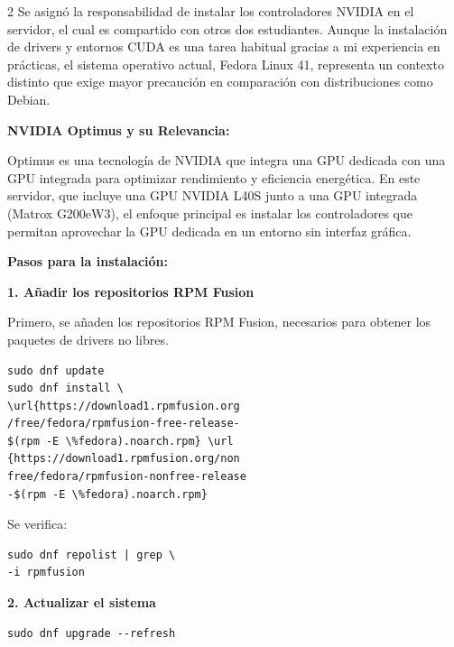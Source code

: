 \begin{multicols*}{2}
Se asignó la responsabilidad de instalar los controladores NVIDIA en el servidor, el cual es compartido con otros dos estudiantes. Aunque la instalación de drivers y entornos CUDA es una tarea habitual gracias a mi experiencia en prácticas, el sistema operativo actual, Fedora Linux 41, representa un contexto distinto que exige mayor precaución en comparación con distribuciones como Debian.

\vspace{\baselineskip}


\noindent\textbf{NVIDIA Optimus y su Relevancia:} 

Optimus es una tecnología de NVIDIA que integra una GPU dedicada con una GPU integrada para optimizar rendimiento y eficiencia energética. En este servidor, que incluye una GPU NVIDIA L40S junto a una GPU integrada (Matrox G200eW3), el enfoque principal es instalar los controladores que permitan aprovechar la GPU dedicada en un entorno sin interfaz gráfica.

\vspace{\baselineskip}

\noindent\textbf{Pasos para la instalación:}

\vspace{\baselineskip}

\noindent\textbf{1. Añadir los repositorios RPM Fusion}

Primero, se añaden los repositorios RPM Fusion, necesarios para obtener los paquetes de drivers no libres.

\begin{verbatim}
sudo dnf update
sudo dnf install \ 
\url{https://download1.rpmfusion.org
/free/fedora/rpmfusion-free-release-
$(rpm -E \%fedora).noarch.rpm} \url
{https://download1.rpmfusion.org/non
free/fedora/rpmfusion-nonfree-release
-$(rpm -E \%fedora).noarch.rpm}
\end{verbatim}


\noindent Se verifica:
\begin{verbatim}
sudo dnf repolist | grep \
-i rpmfusion
\end{verbatim}

\vspace{\baselineskip}

\noindent\textbf{2. Actualizar el sistema}
\begin{verbatim}
sudo dnf upgrade --refresh
\end{verbatim}

\vspace{\baselineskip}


\end{multicols*}
